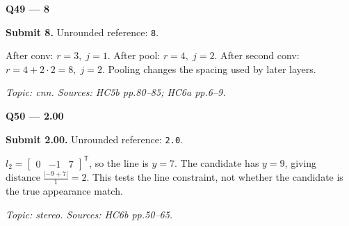 \documentclass[11pt,a4paper]{article}
\begin{document}
\par\vspace{12pt}
\begin{minipage}{\linewidth}
\textbf{Q49 — 8}\par\smallskip
\textbf{Submit 8.} Unrounded reference: \texttt{8}.\par
After conv: \(r=3,\;j=1\). After pool: \(r=4,\;j=2\). After second conv: \(r=4+2\cdot2=8,\;j=2\). Pooling changes the spacing used by later layers.\par
{\small\itshape Topic: cnn. Sources: HC5b pp.80–85; HC6a pp.6–9.}

\end{minipage}
\par\vspace{12pt}
\begin{minipage}{\linewidth}
\textbf{Q50 — 2.00}\par\smallskip
\textbf{Submit 2.00.} Unrounded reference: \texttt{2.0}.\par
\(l_2=\begin{bmatrix}0&-1&7\end{bmatrix}^{\mathsf T}\),\allowbreak{} so the line is \(y=7\). The candidate has \(y=9\),\allowbreak{} giving \(\text{distance}\;\frac{\lvert-9+7\rvert}{1}=2\). This tests the line constraint,\allowbreak{} not whether the candidate is the true appearance match.\par
{\small\itshape Topic: stereo. Sources: HC6b pp.50–65.}

\end{minipage}
\par\vspace{12pt}
\end{document}
